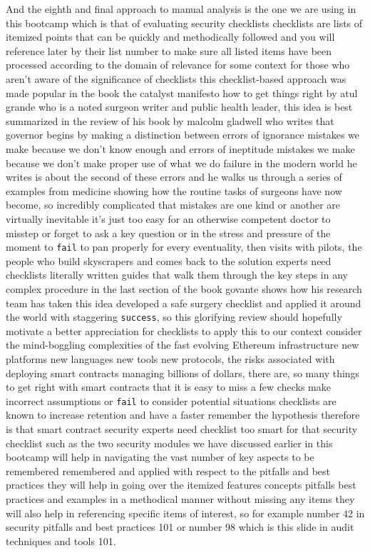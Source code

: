 And the eighth and final approach to manual analysis is the one we are using in this bootcamp which is that of evaluating security checklists checklists are lists of itemized points that can be quickly and methodically followed and you will reference later by their list number to make sure all listed items have been processed according to the domain of relevance for some context for those who aren't aware of the significance of checklists this checklist-based approach was made popular in the book the catalyst manifesto how to get things right by atul grande who is a noted surgeon writer and public health leader, this idea is best summarized in the review of his book by malcolm gladwell who writes that governor begins by making a distinction between errors of ignorance mistakes we make because we don't know enough and errors of ineptitude mistakes we make because we don't make proper use of what we do failure in the modern world he writes is about the second of these errors and he walks us through a series of examples from medicine showing how the routine tasks of surgeons have now become, so incredibly complicated that mistakes are one kind or another are virtually inevitable it's just too easy for an otherwise competent doctor to misstep or forget to ask a key question or in the stress and pressure of the moment to \verb|fail| to pan properly for every eventuality, then visits with pilots, the people who build skyscrapers and comes back to the solution experts need checklists literally written guides that walk them through the key steps in any complex procedure in the last section of the book govante shows how his research team has taken this idea developed a safe surgery checklist and applied it around the world with staggering \verb|success|, so this glorifying review should hopefully motivate a better appreciation for checklists to apply this to our context consider the mind-boggling complexities of the fast evolving Ethereum infrastructure new platforms new languages new tools new protocols, the risks associated with deploying smart contracts managing billions of dollars, there are, so many things to get right with smart contracts that it is easy to miss a few checks make incorrect assumptions or \verb|fail| to consider potential situations checklists are known to increase retention and have a faster remember the hypothesis therefore is that smart contract security experts need checklist too smart for that security checklist such as the two security modules we have discussed earlier in this bootcamp will help in navigating the vast number of key aspects to be remembered remembered and applied with respect to the pitfalls and best practices they will help in going over the itemized features concepts pitfalls best practices and examples in a methodical manner without missing any items they will also help in referencing specific items of interest, so for example number 42 in security pitfalls and best practices 101 or number 98 which is this slide in audit techniques and tools 101.

